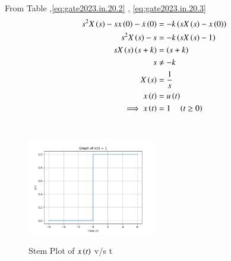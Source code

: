 \documentclass[journal,12pt,twocolumn]{IEEEtran}
\theoremstyle{remark}
\begin{document}
From Table ,\eqref{eq:gate2023.in.20.2} , \eqref{eq:gate2023.in.20.3} 
\begin{align}
s^2 X\left(s\right) - sx\left(0\right) - \dot{x}\left(0\right) &= -k\left(sX\left(s\right) - x\left(0\right)\right) \\
s^2 X\left(s\right) - s &= -k\left(sX\left(s\right)-1\right) \\
sX\left(s\right)\left(s+k\right)&=\left(s+k\right)\\
     s &\neq -k\\
     X\left(s\right)&=\frac{1}{s}  \\
     x\left(t\right)&=u\left(t\right)\\
      \implies x\left(t\right)&=1 \quad \left(t\geq 0\right)
\end{align}\\
\pagebreak
\begin{figure}[h]
    \includegraphics[width=0.5\textwidth]{figs/x(t)_vs_t.png}\label{fig:stem-plot}
    \caption{Stem Plot of $x\left(t\right)$ v/s t}
\end{figure}
\end{document}
